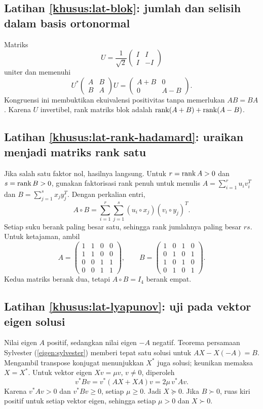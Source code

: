 \subsection*{Latihan \ref{khusus:lat-blok}: jumlah dan selisih dalam basis ortonormal}
Matriks
\[
    U=\frac1{\sqrt2}\begin{pmatrix}I&I\\I&-I\end{pmatrix}
\]
uniter dan memenuhi
\[
    U^*\begin{pmatrix}A&B\\B&A\end{pmatrix}U
       =\begin{pmatrix}A+B&0\\0&A-B\end{pmatrix}.
\]
Kongruensi ini membuktikan ekuivalensi positivitas tanpa
memerlukan $AB=BA$. Karena $U$ invertibel, rank matriks blok
adalah $\operatorname{rank}(A+B)+\operatorname{rank}(A-B)$.

\subsection*{Latihan \ref{khusus:lat-rank-hadamard}: uraikan menjadi matriks rank satu}
Jika salah satu faktor nol, hasilnya langsung. Untuk
$r=\operatorname{rank} A>0$ dan $s=\operatorname{rank} B>0$, gunakan faktorisasi rank penuh
untuk menulis
$A=\sum_{i=1}^r u_iv_i^T$ dan $B=\sum_{j=1}^s x_jy_j^T$.
Dengan perkalian entri,
\[
    A\circ B=\sum_{i=1}^r\sum_{j=1}^s
       (u_i\circ x_j)(v_i\circ y_j)^T.
\]
Setiap suku berank paling besar satu, sehingga rank jumlahnya
paling besar $rs$. Untuk ketajaman, ambil
\[
    A=\begin{pmatrix}1&1&0&0\\1&1&0&0\\0&0&1&1\\0&0&1&1\end{pmatrix},
    \qquad
    B=\begin{pmatrix}1&0&1&0\\0&1&0&1\\1&0&1&0\\0&1&0&1\end{pmatrix}.
\]
Kedua matriks berank dua, tetapi $A\circ B=I_4$ berank empat.

\subsection*{Latihan \ref{khusus:lat-lyapunov}: uji pada vektor eigen solusi}
Nilai eigen $A$ positif, sedangkan nilai eigen $-A$ negatif.
Teorema persamaan Sylvester (\autoref{eigen:sylvester}) memberi
tepat satu solusi untuk $AX-X(-A)=B$.
Mengambil transpose konjugat menunjukkan $X^*$ juga solusi;
keunikan memaksa $X=X^*$.
Untuk vektor eigen $Xv=\mu v$, $v\ne0$, diperoleh
\[
    v^*Bv=v^*(AX+XA)v=2\mu\,v^*Av.
\]
Karena $v^*Av>0$ dan $v^*Bv\ge0$, setiap $\mu\ge0$.
Jadi $X\succeq0$. Jika $B\succ0$, ruas kiri positif untuk
setiap vektor eigen, sehingga setiap $\mu>0$ dan $X\succ0$.

